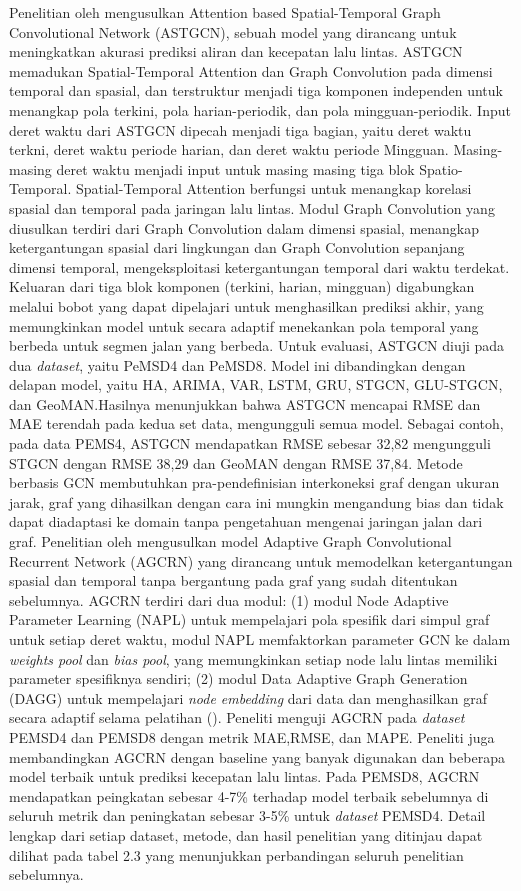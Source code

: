 Penelitian oleh \cite{Guo2019} mengusulkan  Attention based Spatial-Temporal Graph Convolutional Network (ASTGCN), sebuah model yang dirancang untuk meningkatkan akurasi prediksi aliran dan kecepatan lalu lintas. ASTGCN memadukan Spatial-Temporal Attention dan Graph Convolution pada dimensi temporal dan spasial, dan terstruktur menjadi tiga komponen independen untuk menangkap pola terkini, pola harian-periodik, dan pola mingguan-periodik. Input deret waktu dari ASTGCN dipecah menjadi tiga bagian, yaitu deret waktu terkni, deret waktu periode harian, dan deret waktu periode Mingguan. Masing-masing deret waktu menjadi input untuk masing masing tiga blok Spatio-Temporal. Spatial-Temporal Attention berfungsi untuk menangkap korelasi spasial dan temporal pada jaringan lalu lintas. Modul Graph Convolution yang diusulkan  terdiri dari Graph Convolution dalam dimensi spasial, menangkap ketergantungan spasial dari lingkungan dan  Graph Convolution  sepanjang dimensi temporal, mengeksploitasi ketergantungan temporal dari waktu terdekat. Keluaran dari tiga blok komponen (terkini, harian, mingguan) digabungkan melalui bobot yang dapat dipelajari untuk menghasilkan prediksi akhir, yang memungkinkan model untuk secara adaptif menekankan pola temporal yang berbeda untuk segmen jalan yang berbeda. Untuk evaluasi, ASTGCN diuji pada dua \textit{dataset}, yaitu PeMSD4  dan PeMSD8. Model ini dibandingkan dengan delapan model, yaitu HA, ARIMA, VAR, LSTM, GRU, STGCN, GLU-STGCN, dan GeoMAN.Hasilnya menunjukkan bahwa ASTGCN mencapai RMSE dan MAE terendah pada kedua set data, mengungguli semua model. Sebagai contoh, pada data PEMS4, ASTGCN mendapatkan RMSE sebesar 32,82 mengungguli STGCN dengan RMSE 38,29 dan GeoMAN dengan RMSE 37,84. Metode berbasis GCN membutuhkan pra-pendefinisian interkoneksi graf dengan ukuran jarak, graf yang dihasilkan dengan cara ini mungkin mengandung bias dan tidak dapat diadaptasi ke domain tanpa pengetahuan mengenai jaringan jalan dari graf. Penelitian oleh \cite{Bai2020} mengusulkan model Adaptive Graph Convolutional Recurrent Network (AGCRN) yang dirancang untuk memodelkan ketergantungan spasial dan temporal tanpa bergantung pada graf yang sudah ditentukan sebelumnya. AGCRN terdiri dari dua modul: (1) modul Node Adaptive Parameter Learning (NAPL) untuk mempelajari pola spesifik dari simpul graf untuk setiap deret waktu, modul NAPL memfaktorkan parameter GCN ke dalam \textit{weights pool} dan \textit{bias pool}, yang memungkinkan setiap node lalu lintas memiliki parameter spesifiknya sendiri; (2) modul Data Adaptive Graph Generation (DAGG) untuk mempelajari \textit{node embedding } dari data dan menghasilkan graf secara adaptif selama pelatihan (\cite{Bai2020}). Peneliti menguji AGCRN pada \textit{dataset} PEMSD4 dan PEMSD8 dengan metrik MAE,RMSE, dan MAPE. Peneliti juga membandingkan AGCRN dengan baseline yang banyak digunakan dan beberapa model terbaik untuk prediksi kecepatan lalu lintas. Pada PEMSD8, AGCRN mendapatkan peingkatan sebesar 4-7\% terhadap model terbaik sebelumnya di seluruh metrik dan peningkatan sebesar 3-5\% untuk \textit{dataset} PEMSD4. Detail lengkap dari setiap dataset, metode, dan hasil penelitian yang ditinjau dapat dilihat pada tabel 2.3 yang menunjukkan perbandingan seluruh penelitian sebelumnya.

